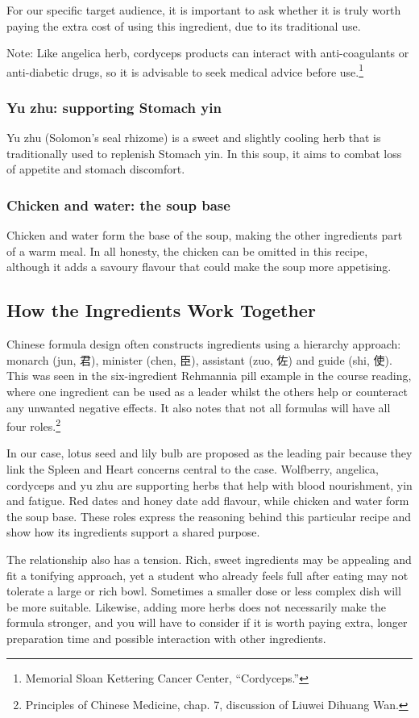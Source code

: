 \documentclass[12pt,a4paper]{article}
\begin{document}
For our specific target audience, it is important to ask whether it is truly worth paying the extra cost of using this ingredient, due to its traditional use.

Note: Like angelica herb, cordyceps products can interact with anti-coagulants or anti-diabetic drugs, so it is advisable to seek medical advice before use.\footnote{Memorial Sloan Kettering Cancer Center, “Cordyceps.”}

\subsubsection*{Yu zhu: supporting Stomach yin}
Yu zhu (Solomon's seal rhizome) is a sweet and slightly cooling herb that is traditionally used to replenish Stomach yin. In this soup, it aims to combat loss of appetite and stomach discomfort.

\subsubsection*{Chicken and water: the soup base}
Chicken and water form the base of the soup, making the other ingredients part of a warm meal. In all honesty, the chicken can be omitted in this recipe, although it adds a savoury flavour that could make the soup more appetising.
\subsection{How the Ingredients Work Together}
Chinese formula design often constructs ingredients using a hierarchy approach: monarch (jun, 君), minister (chen, 臣), assistant (zuo, 佐) and guide (shi, 使). This was seen in the six-ingredient Rehmannia pill example in the course reading, where one ingredient can be used as a leader whilst the others help or counteract any unwanted negative effects. It also notes that not all formulas will have all four roles.\footnote{Principles of Chinese Medicine, chap. 7, discussion of Liuwei Dihuang Wan.}

In our case, lotus seed and lily bulb are proposed as the leading pair because they link the Spleen and Heart concerns central to the case. Wolfberry, angelica, cordyceps and yu zhu are supporting herbs that help with blood nourishment, yin and fatigue. Red dates and honey date add flavour, while chicken and water form the soup base. These roles express the reasoning behind this particular recipe and show how its ingredients support a shared purpose.

The relationship also has a tension. Rich, sweet ingredients may be appealing and fit a tonifying approach, yet a student who already feels full after eating may not tolerate a large or rich bowl. Sometimes a smaller dose or less complex dish will be more suitable. Likewise, adding more herbs does not necessarily make the formula stronger, and you will have to consider if it is worth paying extra, longer preparation time and possible interaction with other ingredients.
\newpage
\end{document}
